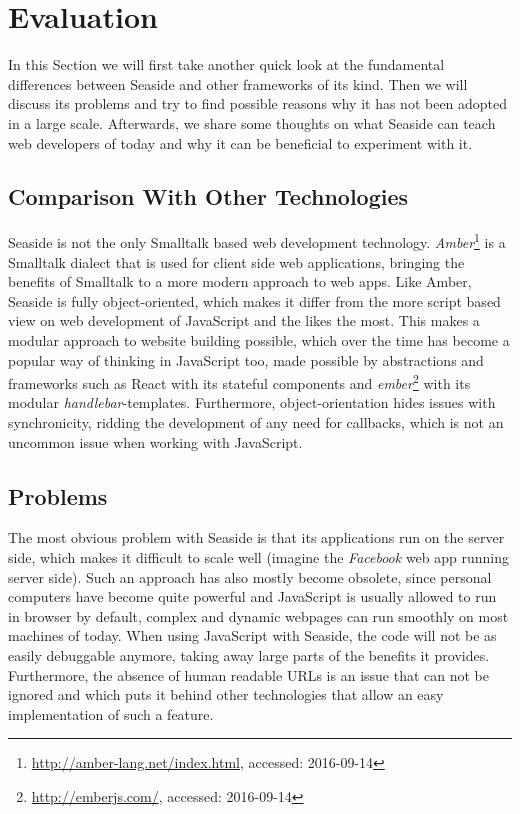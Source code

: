 \documentclass[a4paper,12pt,pagesize,headsepline,titlepage]{scrartcl}
\begin{document}
\section{Evaluation}
\label{sec:evaluation}

In this Section we will first take another quick look at the fundamental differences between Seaside and other frameworks of its kind. Then we will discuss its problems and try to find possible reasons why it has not been adopted in a large scale. Afterwards, we share some thoughts on what Seaside can teach web developers of today and why it can be beneficial to experiment with it.

\subsection{Comparison With Other Technologies}

Seaside is not the only Smalltalk based web development technology. \emph{Amber}\footnote{\url{http://amber-lang.net/index.html}, accessed: 2016-09-14} is a Smalltalk dialect that is used for client side web applications, bringing the benefits of Smalltalk to a more modern approach to web apps.
Like Amber, Seaside is fully object-oriented, which makes it differ from the more script based view on web development of JavaScript and the likes the most. This makes a modular approach to website building possible, which over the time has become a popular way of thinking in JavaScript too, made possible by abstractions and frameworks such as React with its stateful components and \emph{ember}\footnote{\url{http://emberjs.com/}, accessed: 2016-09-14} with its modular \emph{handlebar}-templates. Furthermore, object-orientation hides issues with synchronicity, ridding the development of any need for callbacks, which is not an uncommon issue when working with JavaScript.


\subsection{Problems}

The most obvious problem with Seaside is that its applications run on the server side, which makes it difficult to scale well (imagine the \emph{Facebook} web app running server side). Such an approach has also mostly become obsolete, since personal computers have become quite powerful and JavaScript is usually allowed to run in browser by default, complex and dynamic webpages can run smoothly on most machines of today. When using JavaScript with Seaside, the code will not be as easily debuggable anymore, taking away large parts of the benefits it provides. Furthermore, the absence of human readable URLs is an issue that can not be ignored and which puts it behind other technologies that allow an easy implementation of such a feature. 
\end{document}
